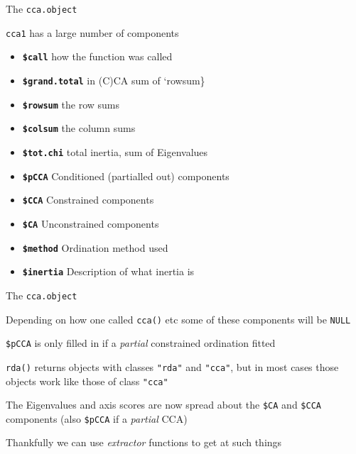 \documentclass[10pt,ignorenonframetext,compress, aspectratio=169]{beamer}
\begin{document}
\begin{frame}{The \texttt{cca.object}}

\texttt{cca1} has a large number of components

\begin{itemize}
\itemsep1pt\parskip0pt
\item
  \textbf{\texttt{\$call}} how the function was called
\item
  \textbf{\texttt{\$grand.total}} in (C)CA sum of `rowsum\}
\item
  \textbf{\texttt{\$rowsum}} the row sums
\item
  \textbf{\texttt{\$colsum}} the column sums
\item
  \textbf{\texttt{\$tot.chi}} total inertia, sum of Eigenvalues
\item
  \textbf{\texttt{\$pCCA}} Conditioned (partialled out) components
\item
  \textbf{\texttt{\$CCA}} Constrained components
\item
  \textbf{\texttt{\$CA}} Unconstrained components
\item
  \textbf{\texttt{\$method}} Ordination method used
\item
  \textbf{\texttt{\$inertia}} Description of what inertia is
\end{itemize}

\end{frame}

\begin{frame}{The \texttt{cca.object}}

Depending on how one called \texttt{cca()} etc some of these components
will be \texttt{NULL}

\texttt{\$pCCA} is only filled in if a \emph{partial} constrained
ordination fitted

\texttt{rda()} returns objects with classes \texttt{"rda"} and
\texttt{"cca"}, but in most cases those objects work like those of class
\texttt{"cca"}

The Eigenvalues and axis scores are now spread about the \texttt{\$CA}
and \texttt{\$CCA} components (also \texttt{\$pCCA} if a \emph{partial}
CCA)

Thankfully we can use \emph{extractor} functions to get at such things

\end{frame}
\end{document}
